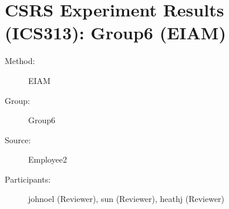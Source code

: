 
%          
	  
\chapter {CSRS Experiment Results (ICS313): Group6 (EIAM)}
\small

\begin{description}
\item [Method:] EIAM
\item [Group:] Group6
\item [Source:] Employee2
\item [Participants:] johnoel (Reviewer), sun (Reviewer), heathj (Reviewer)
\end{description}
